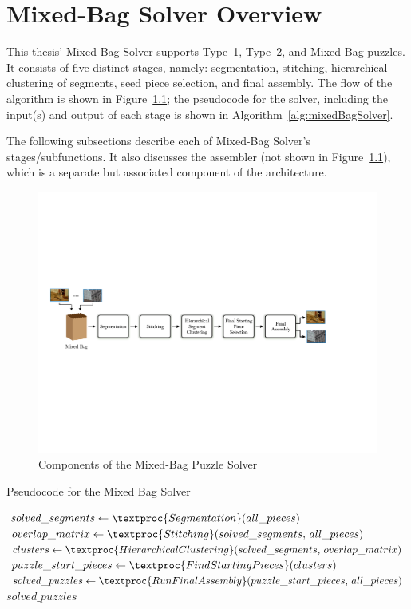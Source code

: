 \chapter{Mixed-Bag Solver Overview}\label{chap:mixedBagSolver}

This thesis' Mixed-Bag Solver supports Type~1, Type~2, and Mixed-Bag puzzles.  It consists of five distinct stages, namely: segmentation, stitching, hierarchical clustering of segments, seed piece selection, and final assembly.  The flow of the algorithm is shown in Figure~\ref{fig:multipuzzleSolverArchitecture}; the pseudocode for the solver, including the input(s) and output of each stage is shown in Algorithm~\ref{alg:mixedBagSolver}.

The following subsections describe each of Mixed-Bag Solver's stages/subfunctions.  It also discusses the assembler (not shown in Figure~\ref{fig:multipuzzleSolverArchitecture}), which is a separate but associated component of the architecture.

\begin{figure}[ht!]
	\centering
		\includegraphics[width=1.0\textwidth]{images/cropped_algorithm_structure_overview.pdf}
	\caption{Components of the Mixed-Bag Puzzle Solver}\label{fig:multipuzzleSolverArchitecture}
\end{figure}

\begin{algorithm}[tb]
\caption{Pseudocode for the Mixed Bag Solver}\label{alg:mixedBagSolver}
\begin{algorithmic}[1]
    \State $solved\_segments \gets \textproc{Segmentation}\text{(} all\_pieces \text{)}$
	\State $overlap\_matrix \gets \textproc{Stitching}\text{(} solved\_segments \text{, } all\_pieces \text{)}$
	\State $clusters \gets \textproc{HierarchicalClustering} \text{(}solved\_segments \text{, } overlap\_matrix \text{)}$
	\State $puzzle\_start\_pieces \gets \textproc{FindStartingPieces} \text{(} clusters \text{)}$
	\State $solved\_puzzles \gets \textproc{RunFinalAssembly} \text{(} puzzle\_start\_pieces \text{, } all\_pieces \text{)}$
    \State \Return $solved\_puzzles$
\EndFunction
\end{algorithmic}
\end{algorithm}

